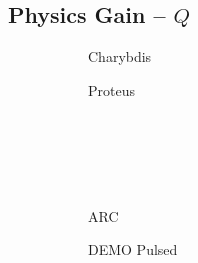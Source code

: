 \clearpage

\newpage

\subsection*{ Physics Gain -- $Q$ }
  \label{subsection:sensitivity_Q}

\begin{figure*}[h!]
    \centering
    \hfill
    \begin{subfigure}[t]{0.45\textwidth}
        \centering
    \begin{adjustbox}{width=\textwidth}
      \Large
      
    \end{adjustbox}
        \caption{Charybdis}
    \end{subfigure}
    \hfill
    \begin{subfigure}[t]{0.45\textwidth}
        \centering
    \begin{adjustbox}{width=\textwidth}
      \Large
      
    \end{adjustbox}
        \caption{Proteus}
    \end{subfigure}
    \hfill \hfill ~\\ ~\\ ~\\ ~\\
    \hfill
    \begin{subfigure}[t]{0.45\textwidth}
        \centering
    \begin{adjustbox}{width=\textwidth}
      \Large
      
    \end{adjustbox}
        \caption{ARC}
    \end{subfigure}
    \hfill
    \begin{subfigure}[t]{0.45\textwidth}
        \centering
    \begin{adjustbox}{width=\textwidth}
      \Large
      
    \end{adjustbox}
        \caption{DEMO Pulsed}
    \end{subfigure}
    \hfill \hfill ~\\ ~\\ ~\\ ~\\
    \hfill
    \begin{subfigure}[t]{0.45\textwidth}
        \centering
    \begin{adjustbox}{width=\textwidth}

\end{adjustbox}
\end{subfigure}
\end{figure*}

